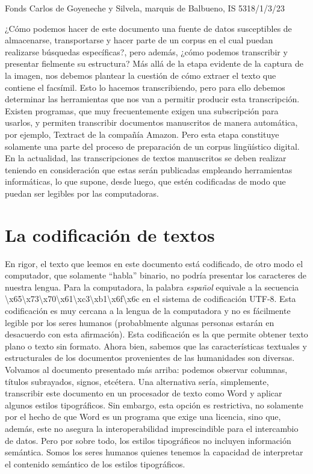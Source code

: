 \documentclass[
]{book}
\begin{document}
Fonds Carlos de Goyeneche y Silvela, marquis de Balbueno, IS 5318/1/3/23

¿Cómo podemos hacer de este documento una fuente de datos susceptibles de almacenarse, transportarse y hacer parte de un corpus en el cual puedan realizarse búsquedas específicas?, pero además, ¿cómo podemos transcribir y presentar fielmente su estructura?
Más allá de la etapa evidente de la captura de la imagen, nos debemos plantear la cuestión de cómo extraer el texto que contiene el facsímil. Esto lo hacemos transcribiendo, pero para ello debemos determinar las herramientas que nos van a permitir producir esta transcripción. Existen programas, que muy frecuentemente exigen una subscripción para usarlos,
y permiten transcribir documentos manuscritos de manera automática, por ejemplo,
Textract de la compañía Amazon. Pero esta etapa constituye solamente una parte del proceso de preparación de un corpus lingüístico digital. En la actualidad, las transcripciones de textos manuscritos se deben realizar teniendo en consideración que estas serán publicadas empleando herramientas informáticas, lo que supone, desde luego, que estén codificadas de modo que puedan ser legibles por las computadoras.

\hypertarget{la-codificaciuxf3n-de-textos}{%
\section*{La codificación de textos}\label{la-codificaciuxf3n-de-textos}}

En rigor, el texto que leemos en este documento está codificado, de otro modo el computador, que solamente ``habla'' binario, no podría presentar los caracteres de nuestra lengua. Para la computadora, la palabra \emph{español} equivale a la secuencia {\textbackslash x65\textbackslash x73\textbackslash x70\textbackslash x61\textbackslash xc3\textbackslash xb1\textbackslash x6f\textbackslash x6c} en el sistema de codificación UTF-8. Esta codificación es muy cercana a la lengua de la computadora y no es fácilmente legible por los seres humanos (probablmente algunas personas estarán en desacuerdo con esta afirmación). Esta codificación es la que permite obtener texto plano o texto sin formato. Ahora bien, sabemos que las características textuales y estructurales de los documentos provenientes de las humanidades son diversas. Volvamos al documento presentado más arriba: podemos observar columnas, títulos subrayados, signos, etcétera. Una alternativa sería, simplemente, transcribir este documento en un procesador de texto como Word y aplicar algunos estilos tipográficos. Sin embargo, esta opción es restrictiva, no solamente por el hecho de que Word es un programa que exige una licencia, sino que, además, este no asegura la interoperabilidad imprescindible para el intercambio de datos. Pero por sobre todo, los estilos tipográficos no incluyen información semántica. Somos los seres humanos quienes tenemos la capacidad de interpretar el contenido semántico de los estilos tipográficos.
\end{document}
